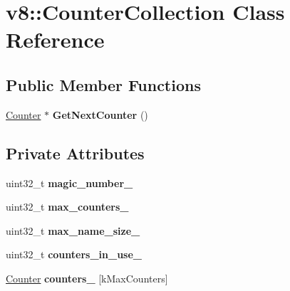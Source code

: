 \hypertarget{classv8_1_1_counter_collection}{}\section{v8\+:\+:Counter\+Collection Class Reference}
\label{classv8_1_1_counter_collection}
\subsection*{Public Member Functions}
\begin{DoxyCompactItemize}
\item 
\hyperlink{classv8_1_1_counter}{Counter} $\ast$ {\bfseries Get\+Next\+Counter} ()\hypertarget{classv8_1_1_counter_collection_a8233c61ab7e4db3d340be7ab7c1bbc1c}{}\label{classv8_1_1_counter_collection_a8233c61ab7e4db3d340be7ab7c1bbc1c}

\end{DoxyCompactItemize}
\subsection*{Private Attributes}
\begin{DoxyCompactItemize}
\item 
uint32\+\_\+t {\bfseries magic\+\_\+number\+\_\+}\hypertarget{classv8_1_1_counter_collection_a81d13be1de7beae6a055d1513c8168de}{}\label{classv8_1_1_counter_collection_a81d13be1de7beae6a055d1513c8168de}

\item 
uint32\+\_\+t {\bfseries max\+\_\+counters\+\_\+}\hypertarget{classv8_1_1_counter_collection_a6651ca088a0f47ba51d5d0d2c70fcea0}{}\label{classv8_1_1_counter_collection_a6651ca088a0f47ba51d5d0d2c70fcea0}

\item 
uint32\+\_\+t {\bfseries max\+\_\+name\+\_\+size\+\_\+}\hypertarget{classv8_1_1_counter_collection_a1671f11f139f141a8b0b13b7b5887d4c}{}\label{classv8_1_1_counter_collection_a1671f11f139f141a8b0b13b7b5887d4c}

\item 
uint32\+\_\+t {\bfseries counters\+\_\+in\+\_\+use\+\_\+}\hypertarget{classv8_1_1_counter_collection_a876392dccea13b942dc4e439d4efd1d9}{}\label{classv8_1_1_counter_collection_a876392dccea13b942dc4e439d4efd1d9}

\item 
\hyperlink{classv8_1_1_counter}{Counter} {\bfseries counters\+\_\+} \mbox{[}k\+Max\+Counters\mbox{]}\hypertarget{classv8_1_1_counter_collection_a2c113a956192e4f8b2158fda3aba6c45}{}\label{classv8_1_1_counter_collection_a2c113a956192e4f8b2158fda3aba6c45}

\end{DoxyCompactItemize}
